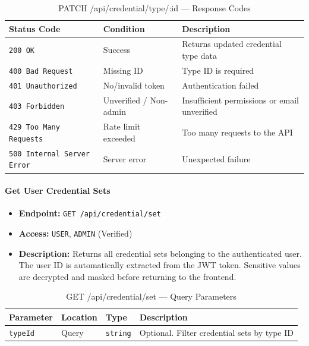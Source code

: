 \begin{table}[H]
\centering
\renewcommand{\arraystretch}{1.3}
\begin{tabularx}{\textwidth}{|l|l|X|}
\hline
\textbf{Status Code} & \textbf{Condition} & \textbf{Description} \\
\hline
\texttt{200 OK}           & Success              & Returns updated credential type data \\
\hline
\texttt{400 Bad Request}  & Missing ID           & Type ID is required \\
\hline
\texttt{401 Unauthorized} & No/invalid token     & Authentication failed \\
\hline
\texttt{403 Forbidden}    & Unverified / Non-admin & Insufficient permissions or email unverified \\
\hline
\texttt{429 Too Many Requests} & Rate limit exceeded & Too many requests to the API \\
\hline
\texttt{500 Internal Server Error} & Server error & Unexpected failure \\
\hline
\end{tabularx}
\caption{PATCH /api/credential/type/:id — Response Codes}
\label{tab:update-credential-type-responses}
\end{table}
\FloatBarrier

\paragraph{Get User Credential Sets}
\label{subsubsec:get-user-credential-sets}

\begin{itemize}
  \item \textbf{Endpoint:} \texttt{GET /api/credential/set}
  \item \textbf{Access:} \texttt{USER}, \texttt{ADMIN} (Verified)
  \item \textbf{Description:} Returns all credential sets belonging to the authenticated user.
  The user ID is automatically extracted from the JWT token.
  Sensitive values are decrypted and masked before returning to the frontend.
\end{itemize}

\begin{table}[H]
\centering
\renewcommand{\arraystretch}{1.3}
\begin{tabularx}{\textwidth}{|l|l|l|X|}
\hline
\textbf{Parameter} & \textbf{Location} & \textbf{Type} & \textbf{Description} \\
\hline
\texttt{typeId}    & Query & \texttt{string}  & Optional. Filter credential sets by type ID \\
\hline
\end{tabularx}
\caption{GET /api/credential/set — Query Parameters}
\label{tab:get-user-credential-sets-params}
\end{table}

